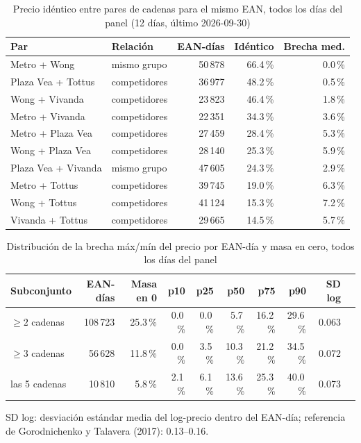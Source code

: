 
\begin{table}[htbp]
\caption{Precio id\'entico entre pares de cadenas para el mismo EAN, todos los d\'ias del panel (12 d\'ias, \'ultimo 2026-09-30)}
\label{tab:identidad}
\centering\scriptsize\setlength{\tabcolsep}{3pt}
\begin{tabular}{@{}llrrr@{}}
\toprule
Par & Relaci\'on & EAN-d\'ias & Id\'entico & Brecha med. \\
\midrule
Metro + Wong & mismo grupo & 50\,878 & 66.4\,\% & 0.0\,\% \\
Plaza Vea + Tottus & competidores & 36\,977 & 48.2\,\% & 0.5\,\% \\
Wong + Vivanda & competidores & 23\,823 & 46.4\,\% & 1.8\,\% \\
Metro + Vivanda & competidores & 22\,351 & 34.3\,\% & 3.6\,\% \\
Metro + Plaza Vea & competidores & 27\,459 & 28.4\,\% & 5.3\,\% \\
Wong + Plaza Vea & competidores & 28\,140 & 25.3\,\% & 5.9\,\% \\
Plaza Vea + Vivanda & mismo grupo & 47\,605 & 24.3\,\% & 2.9\,\% \\
Metro + Tottus & competidores & 39\,745 & 19.0\,\% & 6.3\,\% \\
Wong + Tottus & competidores & 41\,124 & 15.3\,\% & 7.2\,\% \\
Vivanda + Tottus & competidores & 29\,665 & 14.5\,\% & 5.7\,\% \\
\bottomrule\end{tabular}\end{table}

\begin{table}[t]
\caption{Distribuci\'on de la brecha m\'ax/m\'in del precio por EAN-d\'ia y masa en cero, todos los d\'ias del panel}
\label{tab:brecha}
\centering\scriptsize\setlength{\tabcolsep}{4pt}
\begin{tabular}{@{}lrrrrrrrrr@{}}
\toprule
Subconjunto & EAN-d\'ias & Masa en 0 & p10 & p25 & p50 & p75 & p90 & SD log \\
\midrule
$\geq 2$ cadenas & 108\,723 & 25.3\,\% & 0.0\,\% & 0.0\,\% & 5.7\,\% & 16.2\,\% & 29.6\,\% & 0.063 \\
$\geq 3$ cadenas & 56\,628 & 11.8\,\% & 0.0\,\% & 3.5\,\% & 10.3\,\% & 21.2\,\% & 34.5\,\% & 0.072 \\
las 5 cadenas & 10\,810 & 5.8\,\% & 2.1\,\% & 6.1\,\% & 13.6\,\% & 25.3\,\% & 40.0\,\% & 0.073 \\
\bottomrule\end{tabular}
\par\smallskip\raggedright\scriptsize SD log: desviaci\'on est\'andar media del log-precio dentro del EAN-d\'ia; referencia de Gorodnichenko y Talavera (2017): 0.13--0.16.
\end{table}

